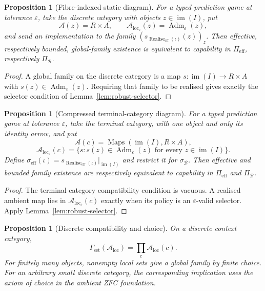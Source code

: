 \documentclass[11pt]{article}
\theoremstyle{plain}
\newtheorem{proposition}[theorem]{Proposition}
\theoremstyle{definition}
\theoremstyle{remark}
\newcommand{\im}{\operatorname{im}}
\newcommand{\Adm}{\operatorname{Adm}}
\newcommand{\realise}{\operatorname{Realise}}
\newcommand{\LocalAdm}{\mathcal{A}_{\mathrm{loc}}}
\newcommand{\eps}{\varepsilon}
\begin{document}
\begin{proposition}[Fibre-indexed static diagram]\label{prop:fibre-diagram}
For a typed prediction game at tolerance $\eps$, take the discrete category with
objects $z\in\im(I)$, put
\[
\mathcal A(z)=R\times A,
\qquad
\LocalAdm_\eps(z)=\Adm_\eps(z),
\]
and send an implementation to the family
$(s_{\realise_{\mathrm{eff}}(\iota)}(z))_z$. Then effective, respectively
bounded, global-family existence is equivalent to capability in
$\Pi_{\mathrm{eff}}$, respectively $\Pi_{\mathcal B}$.
\end{proposition}

\begin{proof}
A global family on the discrete category is a map
$s:\im(I)\to R\times A$ with $s(z)\in\Adm_\eps(z)$. Requiring that family to be
realised gives exactly the selector condition of
Lemma~\ref{lem:robust-selector}.
\end{proof}

\begin{proposition}[Compressed terminal-category diagram]\label{prop:reduction}
For a typed prediction game at tolerance $\eps$, take the terminal category, with one object and only its identity arrow, and
put
\[
\mathcal A(c)=\operatorname{Maps}(\im(I),R\times A),
\]
\[
\LocalAdm_\eps(c)=
\{s:s(z)\in\Adm_\eps(z)\text{ for every }z\in\im(I)\}.
\]
Define
$\sigma_{\mathrm{eff}}(\iota)=
s_{\realise_{\mathrm{eff}}(\iota)}|_{\im(I)}$ and restrict it for
$\sigma_{\mathcal B}$. Then effective and bounded family existence are
respectively equivalent to capability in $\Pi_{\mathrm{eff}}$ and
$\Pi_{\mathcal B}$.
\end{proposition}

\begin{proof}
The terminal-category compatibility condition is vacuous. A realised ambient map lies
in $\LocalAdm_\eps(c)$ exactly when its policy is an $\eps$-valid selector.
Apply Lemma~\ref{lem:robust-selector}.
\end{proof}

\begin{proposition}[Discrete compatibility and choice]\label{prop:discreteVanishing}
On a discrete context category,
\[
\Gamma_{\mathrm{set}}(\LocalAdm)=\prod_c\LocalAdm(c).
\]
For finitely many objects, nonempty local sets give a global family by finite
choice. For an arbitrary small discrete category, the corresponding implication
uses the axiom of choice in the ambient ZFC foundation.
\end{proposition}
\end{document}
